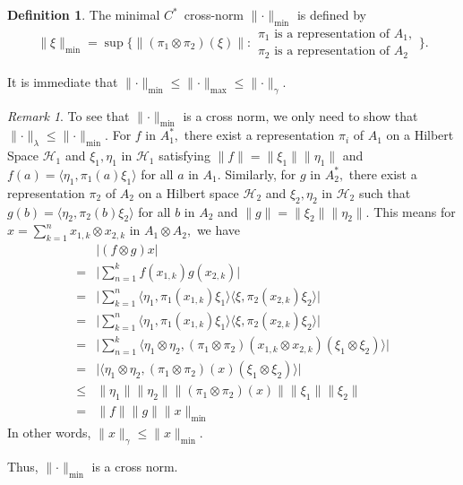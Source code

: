 \documentclass{article}
\theoremstyle{plain}
\theoremstyle{definition}
\newtheorem{definition}[theorem]{Definition}
\theoremstyle{remark}
\newtheorem{remark}[theorem]{Remark}
\begin{document}
\begin{definition}
	The minimal $C^\ast$~cross\nobreakdash-norm $\lVert \cdot \rVert_{\min}$ is defined by
$$\lVert \xi \rVert_{\min} 
= \sup\{ \lVert (\pi_1 \otimes \pi_2) (\xi) \rVert \colon 
\begin{array}{c}
\pi_1 \text{ is a representation of } A_1, \\
\pi_2 \text{ is a representation of } A_2 
\end{array}
\} .$$
\end{definition}
It is immediate that $\lVert \cdot \rVert_{\min} \leq \lVert \cdot \rVert_{\max} \leq 
\lVert \cdot \rVert_\gamma.$ 
\begin{remark}
	To see that $\lVert \cdot \rVert_{\min}$ is a cross norm, we only need to show that $\lVert \cdot \rVert_{\lambda}
	\leq \lVert \cdot \rVert_{\min}.$
	For $f$ in $A_1^\ast,$ there exist a representation $\pi_i$ of $A_1$ on a Hilbert Space $\mathcal{H}_1 $ and $\xi_1, \eta_1$
	in $\mathcal{H}_1$ satisfying $\lVert f \rVert = \lVert \xi_1 \rVert \lVert \eta_1 \rVert$ and
	$f(a) = \langle\eta_1, \pi_1(a) \xi_1\rangle$ for all $a$ in $A_1.$ Similarly, for $g$ in $A_2^\ast,$ there exist a representation
	$\pi_2$ of $A_2$ on a Hilbert space $\mathcal{H}_2$ and $\xi_2, \eta_2$ in $\mathcal{H}_2$ such that
	$g(b) = \langle \eta_2, \pi_2(b) \xi_2 \rangle$ for all $b$ in $A_2$ and $\lVert g \rVert = \lVert \xi_2 \rVert \lVert \eta_2 \rVert.$ This means for $x = \sum_{k=1}^{n} x_{1,k} \otimes x_{2,k}$ in $A_1 \otimes A_2,$ we have
	\begin{align*}
		{}& \lvert (f \otimes g) x \rvert \\
		={}&  \lvert \sum_{n=1}^{k} f(x_{1,k}) g(x_{2,k}) \rvert \\
		={}&  \lvert \sum_{k=1}^{n} \langle\eta_1, \pi_1(x_{1,k}) \xi_1\rangle 
		\langle\xi, \pi_2(x_{2,k}) \xi_2\rangle \rvert \\
		={}& \lvert \sum_{k=1}^{n} \langle\eta_1, \pi_1(x_{1,k}) \xi_1\rangle 
		\langle\xi, \pi_2(x_{2,k}) \xi_2\rangle \rvert \\
		={}& \lvert \sum_{n=1}^{k} \langle \eta_1 \otimes \eta_2, (\pi_1 \otimes \pi_2) (x_{1,k} \otimes x_{2,k}) (\xi_1 \otimes \xi_2) \rangle \rvert \\
		={}&  \lvert \langle \eta_1 \otimes \eta_2, (\pi_1 \otimes \pi_2) ( x) (\xi_1 \otimes \xi_2)\rangle \rvert \\
		\leq{}& \lVert \eta_1 \rVert \lVert \eta_2 \rVert \lVert (\pi_1 \otimes \pi_2)(x) \rVert
		\lVert \xi_1 \rVert \lVert \xi_2 \rVert \\
		={}& \lVert f \rVert \lVert g \rVert \lVert x \rVert_{\min}
	\end{align*}
	In other words, $\lVert x \rVert_\gamma \leq \lVert x \rVert_{\min}.$
\end{remark}
Thus, $\lVert \cdot \rVert_{\min}$ is a cross norm.
\end{document}
